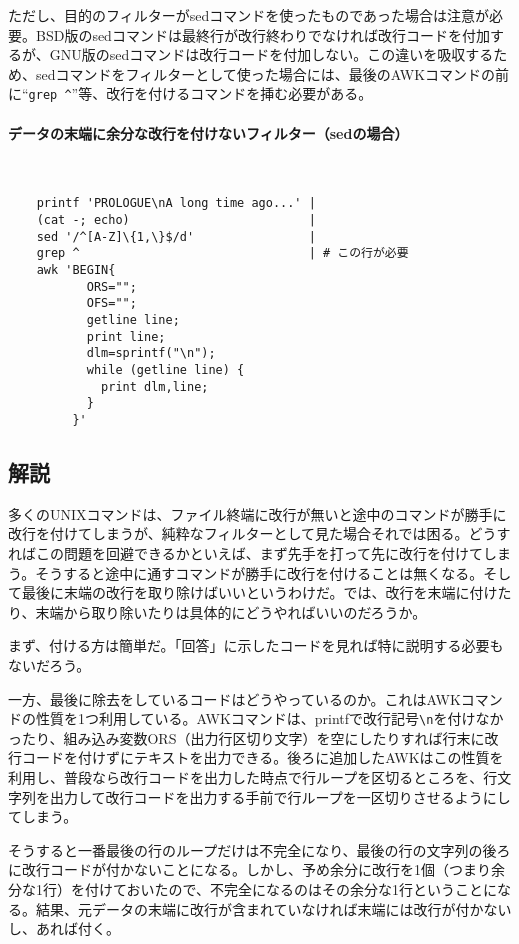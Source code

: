 ただし、目的のフィルターがsedコマンドを使ったものであった場合は注意が必要。BSD版のsedコマンドは最終行が改行終わりでなければ改行コードを付加するが、GNU版のsedコマンドは改行コードを付加しない。この違いを吸収するため、sedコマンドをフィルターとして使った場合には、最後のAWKコマンドの前に``\verb|grep ^|''等、改行を付けるコマンドを挿む必要がある。

\paragraph{データの末端に余分な改行を付けないフィルター（sedの場合）} 　\\
\begin{frameboxit}{160.0mm}
\begin{verbatim}
	printf 'PROLOGUE\nA long time ago...' |
	(cat -; echo)                         |
	sed '/^[A-Z]\{1,\}$/d'                |
	grep ^                                | # この行が必要
	awk 'BEGIN{
	       ORS="";
	       OFS="";
	       getline line;
	       print line;
	       dlm=sprintf("\n");
	       while (getline line) {
	         print dlm,line;
	       }
	     }'
\end{verbatim}
\end{frameboxit}

\subsection*{解説}

多くのUNIXコマンドは、ファイル終端に改行が無いと途中のコマンドが勝手に改行を付けてしまうが、純粋なフィルターとして見た場合それでは困る。どうすればこの問題を回避できるかといえば、まず先手を打って先に改行を付けてしまう。そうすると途中に通すコマンドが勝手に改行を付けることは無くなる。そして最後に末端の改行を取り除けばいいというわけだ。では、改行を末端に付けたり、末端から取り除いたりは具体的にどうやればいいのだろうか。

まず、付ける方は簡単だ。「回答」に示したコードを見れば特に説明する必要もないだろう。

一方、最後に除去をしているコードはどうやっているのか。これはAWKコマンドの性質を1つ利用している。AWKコマンドは、printfで改行記号\verb|\n|を付けなかったり、組み込み変数ORS（出力行区切り文字）を空にしたりすれば行末に改行コードを付けずにテキストを出力できる。後ろに追加したAWKはこの性質を利用し、普段なら改行コードを出力した時点で行ループを区切るところを、行文字列を出力して改行コードを出力する手前で行ループを一区切りさせるようにしてしまう。

そうすると一番最後の行のループだけは不完全になり、最後の行の文字列の後ろに改行コードが付かないことになる。しかし、予め余分に改行を1個（つまり余分な1行）を付けておいたので、不完全になるのはその余分な1行ということになる。結果、元データの末端に改行が含まれていなければ末端には改行が付かないし、あれば付く。


